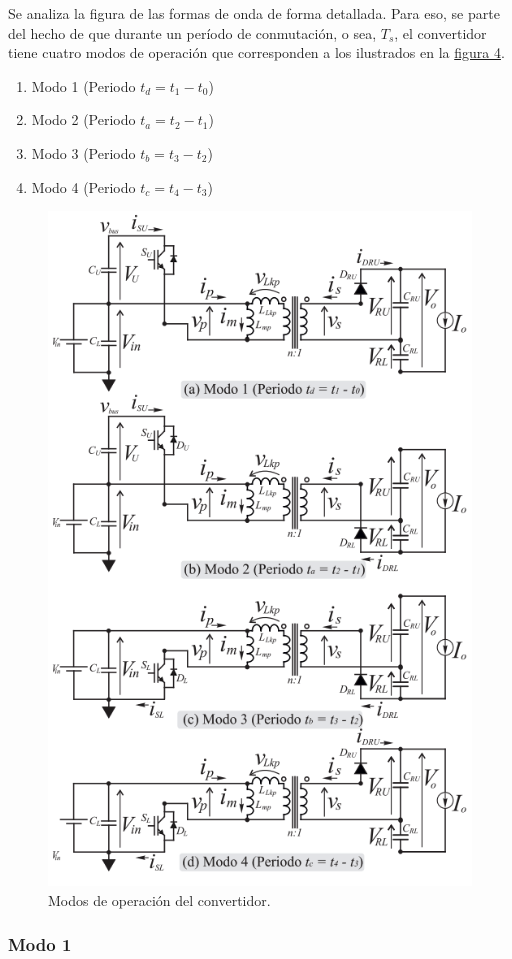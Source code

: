 Se analiza la figura de las formas de onda de forma detallada. Para eso, se parte del hecho de que durante un período de conmutación, o sea, $T_s$, el convertidor tiene cuatro modos de operación que corresponden a los ilustrados en la \hyperref[fig:modosoperacion]{figura 4}.

\begin{enumerate}
	\item Modo 1 (Periodo \( t_d = t_1 - t_0 \))
	\item Modo 2 (Periodo \( t_a = t_2 - t_1 \))
	\item Modo 3 (Periodo \( t_b = t_3 - t_2 \))
	\item Modo 4 (Periodo \( t_c = t_4 - t_3 \))
\end{enumerate}

\begin{figure}
	\centering
	\includegraphics[width=0.7\linewidth]{img/modosOperacion}
	\caption{Modos de operación del convertidor.}
	\label{fig:modosoperacion}
\end{figure}


\subsubsection{Modo 1}

